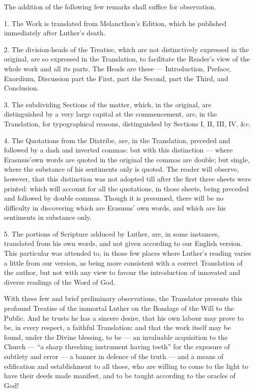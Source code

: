 The addition of the following few remarks shall suffice for observation.

1. The Work is translated from Melancthon’s Edition, which he published immediately after Luther’s death.

2. The division-heads of the Treatise, which are not distinctively expressed in the original, are so expressed in the Translation, to facilitate the Reader’s view of the whole work and all its parts. The Heads are these — Introduction, Preface, Exordium, Discussion part the First, part the Second, part the Third, and Conclusion.

3. The subdividing Sections of the matter, which, in the original, are distinguished by a very large capital at the commencement, are, in the Translation, for typographical reasons, distinguished by Sections I, II, III, IV, \&c.

4. The Quotations from the Diatribe, are, in the Translation, preceded and followed by a dash and inverted commas: but with this distinction — where Erasmus’own words are quoted in the original the commas are double; but single, where the substance of his sentiments only is quoted. The reader will observe, however, that this distinction was not adopted till after the first three sheets were printed: which will account for all the quotations, in those sheets, being preceded and followed by double commas. Though it is presumed, there will be no difficulty in discovering which are Erasmus’ own words, and which are his sentiments in substance only.

5. The portions of Scripture adduced by Luther, are, in some instances, translated from his own words, and not given according to our English version. This particular was attended to, in those few places where Luther’s reading varies a little from our version, as being more consistent with a correct Translation of the author, but not with any view to favour the introduction of innovated and diverse readings of the Word of God.

With these few and brief preliminary observations, the Translator presents this profound Treatise of the immortal Luther on the Bondage of the Will to the Public. And he trusts he has a sincere desire, that his own labour may prove to be, in every respect, a faithful Translation: and that the work itself may be found, under the Divine blessing, to be — an invaluable acquisition to the Church — “a sharp threshing instrument having teeth” for the exposure of subtlety and error — a banner in defence of the truth — and a means of edification and establishment to all those, who are willing to come to the light to have their deeds made manifest, and to be taught according to the oracles of God!

